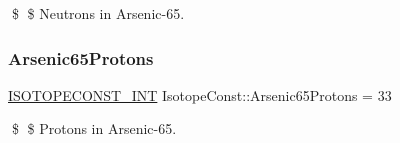 \$ \$ Neutrons in Arsenic-\/65. \mbox{\label{group___isotope_const-_arsenic-_as65_gabe395909588b354a7aff170bdf588181}} 
\subsubsection{\texorpdfstring{Arsenic65\+Protons}{Arsenic65Protons}}
{\footnotesize\ttfamily \mbox{\hyperlink{group___isotope_const-_macros_ga5f18360b3e99483a35c32d789e62621c}{I\+S\+O\+T\+O\+P\+E\+C\+O\+N\+S\+T\+\_\+\+I\+NT}} Isotope\+Const\+::\+Arsenic65\+Protons = 33}

\$ \$ Protons in Arsenic-\/65. 